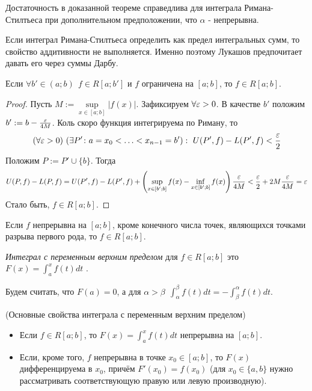\begin{note}
	Достаточность в доказанной теореме справедлива для интеграла Римана-Стилтьеса при дополнительном предположении, что $\alpha$ - непрерывна.
\end{note}

\begin{note}
	Если интеграл Римана-Стилтьеса определить как предел интегральных сумм, то свойство аддитивности не выполняется. Именно поэтому Лукашов предпочитает давать его через суммы Дарбу.
\end{note}


\begin{theorem}
	Если $\forall b' \in (a; b)\ \ f \in R[a; b']$ и $f$ ограничена на $[a; b]$, то $f \in R[a; b]$.
\end{theorem}

\begin{proof}
	Пусть $M := \sup\limits_{x \in [a; b]} |f(x)|$. Зафиксируем $\forall \varepsilon > 0$. В качестве $b'$ положим $b' := b - \frac{\varepsilon}{4M}$. Коль скоро функция интегрируема по Риману, то
	\[
		(\forall \varepsilon > 0)\ (\exists P' \colon a = x_0 < \ldots < x_{n - 1} = b') :\ U(P', f) - L(P', f) < \frac{\varepsilon}{2}
	\]
	Положим $P := P' \cup \{b\}$. Тогда
	\[
		U(P, f) - L(P, f) = U(P', f) - L(P', f) + \left(\sup\limits_{x \in [b'; b]} f(x) - \inf\limits_{x \in [b'; b]} f(x)\right) \frac{\varepsilon}{4M} < \frac{\varepsilon}{2} +2M\frac{\varepsilon }{4M}=\varepsilon
	\]
	Стало быть, $f \in R[a; b]$.
\end{proof}

\begin{corollary}
	Если $f$ непрерывна на $[a; b]$, кроме конечного числа точек, являющихся точками разрыва первого рода, то $f \in R[a; b]$.
\end{corollary}

\begin{definition}
	\textit{Интеграл с переменным верхним пределом} для $f \in R[a; b]$ это $F(x) = \int_a^{x} f(t)dt$ .
	
	Будем считать, что $F(a) = 0$, а для $\alpha > \beta\ \ \int_\alpha^\beta f(t)dt = -\int_\beta^\alpha f(t)dt$. 
\end{definition}

\begin{theorem} (Основные свойства интеграла с переменным верхним пределом)
	\begin{itemize}
		\item Если $f \in R[a; b]$, то $F(x) = \int_a^{x} f(t)dt$ непрерывна на $[a; b]$.
		
		\item Если, кроме того, $f$ непрерывна в точке $x_0 \in [a; b]$, то $F(x)$ дифференцируема в $x_0$, причём $F'(x_0) = f(x_0)$ (для $x_0 \in \{a, b\}$ нужно рассматривать соответствующую правую или левую производную).
	\end{itemize}
\end{theorem}

